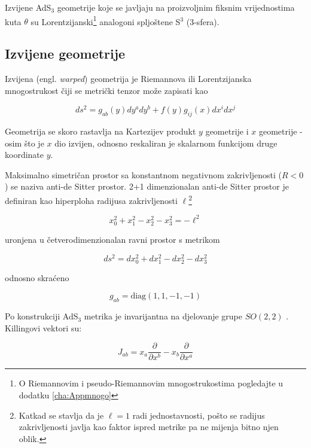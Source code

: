 \noindent Izvijene AdS${}_3$ geometrije koje se javljaju na proizvoljnim fiksnim vrijednostima kuta $\theta$ su Lorentzijanski\footnote{O Riemannovim i pseudo-Riemannovim mnogostrukostima pogledajte u dodatku \ref{cha:Appmnogo}} analogoni spljoštene S${}^3$ (3-sfera).

\subsection{Izvijene geometrije}

Izvijena (engl. \textit{warped}) geometrija je Riemannova ili Lorentzijanska mnogostrukost čiji se metrički tenzor može zapisati kao

\begin{equation*}
ds^2 = g_{ab}(y)dy^a dy^b + f(y) g_{ij}(x) dx^i dx^j
\end{equation*}

\noindent Geometrija se skoro rastavlja na Kartezijev produkt $y$ geometrije i $x$ geometrije - osim što je $x$ dio izvijen, odnosno reskaliran je skalarnom funkcijom druge koordinate $y$.

\newpage

Maksimalno simetričan prostor sa konstantnom negativnom zakrivljenosti ($R<0$) se naziva anti-de Sitter prostor. 2+1 dimenzionalan anti-de Sitter prostor je definiran kao hiperploha radijusa zakrivljenosti $\ell$\footnote{Katkad se stavlja da je $\ell=1$ radi jednostavnosti, pošto se radijus zakrivljenosti javlja kao faktor ispred metrike pa ne mijenja bitno njen oblik.}

\begin{equation*}
x_0^2+x_1^2-x_2^2-x_3^2=-\ell^2
\end{equation*}

\noindent uronjena u četverodimenzionalan ravni prostor s metrikom 

\begin{equation*}
ds^2=dx_0^2+dx_1^2-dx_2^2-dx_3^2
\end{equation*}

\noindent odnosno skraćeno

\begin{equation*}
g_{ab}=\textrm{diag}(1,1,-1,-1)
\end{equation*}

\noindent Po konstrukciji AdS${}_3$ metrika je invarijantna na djelovanje grupe $SO(2,2)$ \citep{Banados:1992gq, Anninos:2008fx}. Killingovi vektori su:

\begin{equation*}
J_{ab}=x_a\frac{\partial}{\partial x^b}-x_b\frac{\partial}{\partial x^a}
\end{equation*}

